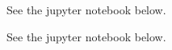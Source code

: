 \documentclass{article}
\begin{document}
\bigskip
\begin{prob}
\end{prob}
See the jupyter notebook below.

\bigskip
\begin{prob}
\end{prob}
See the jupyter notebook below.



\end{document}
